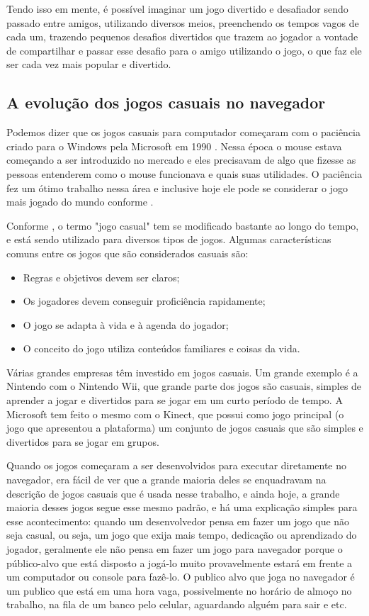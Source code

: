 Tendo isso em mente, é possível imaginar um jogo divertido e desafiador
sendo passado entre amigos, utilizando diversos meios, preenchendo os
tempos vagos de cada um, trazendo pequenos desafios divertidos que
trazem ao jogador a vontade de compartilhar e passar esse desafio para
o amigo utilizando o jogo, o que faz ele ser cada vez mais popular e
divertido.

\subsection{A evolução dos jogos casuais no navegador}

Podemos dizer que os jogos casuais para computador começaram com
o paciência criado para o Windows pela Microsoft em 1990 \cite{trefry2010casual}.
Nessa época o mouse estava começando a ser introduzido no mercado e
eles precisavam de algo que fizesse as pessoas entenderem como o mouse
funcionava e quais suas utilidades. O paciência fez um ótimo trabalho
nessa área e inclusive hoje ele pode se considerar o jogo mais jogado
do mundo conforme .

Conforme , o termo "jogo casual" tem se
modificado bastante ao longo do tempo, e está sendo utilizado para
diversos tipos de jogos. Algumas características comuns entre os jogos
que são considerados casuais são:

\begin{itemize}
    \item Regras e objetivos devem ser claros;
    \item Os jogadores devem conseguir proficiência rapidamente;
    \item O jogo se adapta à vida e à agenda do jogador;
    \item O conceito do jogo utiliza conteúdos familiares e coisas da vida.
\end{itemize}

Várias grandes empresas têm investido em jogos casuais. Um grande
exemplo é a Nintendo com o Nintendo Wii, que grande parte dos jogos
são casuais, simples de aprender a jogar e divertidos para se jogar
em um curto período de tempo.
A Microsoft tem feito o mesmo com o Kinect, que
possui como jogo principal (o jogo que apresentou a plataforma) um
conjunto de jogos casuais que são simples e divertidos para se jogar
em grupos.

Quando os jogos começaram a ser desenvolvidos para executar
diretamente no navegador, era fácil de ver que a grande maioria deles
se enquadravam na descrição de jogos casuais que é usada nesse
trabalho, e ainda hoje, a grande maioria desses jogos segue
esse mesmo padrão, e há uma explicação simples para esse
acontecimento: quando um desenvolvedor pensa em fazer um jogo que
não seja casual, ou seja, um jogo que exija mais tempo, dedicação ou
aprendizado do jogador, geralmente ele não pensa em fazer um jogo para
navegador porque o público-alvo que está disposto a jogá-lo muito
provavelmente estará em frente a um computador ou console para
fazê-lo.
O publico alvo que joga no navegador é um publico que está em uma hora
vaga, possivelmente no horário de almoço no trabalho, na fila de um
banco pelo celular, aguardando alguém para sair e etc.

